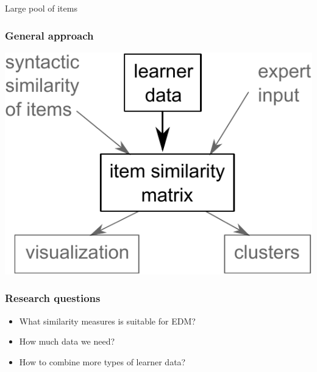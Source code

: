 \documentclass[xcolor=svgnames]{beamer}
\begin{document}
\begin{frame}
    Large pool of items
    \large



\end{frame}
\begin{frame}
    \frametitle{General approach}
    \centering
    \includegraphics[width=.9\linewidth]{figures/general-approach}
\end{frame}
\begin{frame}
    \frametitle{Research questions}
    \centering
    \Large
    \begin{itemize}
        \item What similarity measures is suitable for EDM?
        \item How much data we need?
        \item How to combine more types of learner data?
    \end{itemize}
\end{frame}
\end{document}
